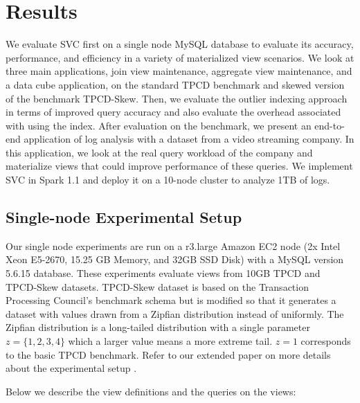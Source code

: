 \vspace{-.5em}
\section{Results}
\label{exp}
We evaluate SVC first on a single node MySQL database to evaluate its accuracy, performance, and efficiency in a variety of materialized view 
scenarios.
We look at three main applications, join view maintenance, aggregate view maintenance, and a data cube application, on the standard TPCD benchmark 
and skewed version of the benchmark TPCD-Skew.
Then, we evaluate the outlier indexing approach in terms of improved query accuracy and also evaluate the overhead associated with using the index.
After evaluation on the benchmark, we present an end-to-end application of log analysis with a dataset from a video streaming company.
In this application, we look at the real query workload of the company and materialize views that could improve performance of these queries.
We implement SVC in Spark 1.1 and deploy it on a 10-node cluster to analyze 1TB of logs.

\subsection{Single-node Experimental Setup}
Our single node experiments are run on a r3.large Amazon EC2 node (2x Intel Xeon E5-2670, 15.25 GB Memory, and 32GB SSD Disk) with a MySQL version 5.6.15 database.
These experiments evaluate views from 10GB TPCD and TPCD-Skew datasets.
TPCD-Skew dataset \cite{tpcdskew} is based on the Transaction Processing Council's benchmark
schema but is modified so that it generates a dataset with values drawn from a Zipfian distribution instead of uniformly.
The Zipfian distribution \cite{mitzenmacher2004brief} is a long-tailed distribution with a single parameter $z=\{1,2,3,4\}$ which a larger
value means a more extreme tail.
$z=1$ corresponds to the basic TPCD benchmark. 
Refer to our extended paper on more details about the experimental setup .

Below we describe the view definitions and the queries on the views:

